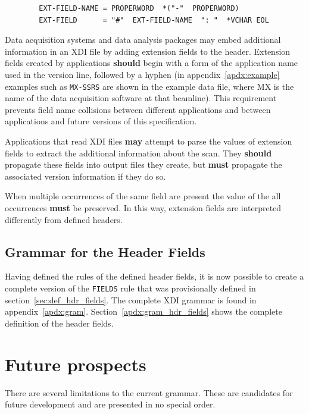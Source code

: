 \documentclass{article}
\newcommand{\xdi}{\textsf{XDI}}
\begin{document}
\begin{verbatim}
        EXT-FIELD-NAME = PROPERWORD  *("-"  PROPERWORD)
        EXT-FIELD      = "#"  EXT-FIELD-NAME  ": "  *VCHAR EOL
\end{verbatim}

Data acquisition systems and data analysis packages may embed
additional information in an {\xdi} file by adding extension fields to
the header.  Extension fields created by applications \textbf{should}
begin with a form of the application name used in the version line,
followed by a hyphen (in appendix~\ref{apdx:example} examples such as
\texttt{MX-SSRS} are shown in the example data file, where MX is the
name of the data acquisition software at that beamline).  This
requirement prevents field name collisions between different
applications and between applications and future versions of this
specification.

Applications that read {\xdi} files \textbf{may} attempt to parse the
values of extension fields to extract the additional information about
the scan.  They \textbf{should} propagate these fields into output
files they create, but \textbf{must} propagate the associated version
information if they do so.

When multiple occurrences of the same field are present the value of
the all occurrences \textbf{must} be preserved.  In this way,
extension fields are interpreted differently from defined headers.

\subsection{Grammar for the Header Fields}
\label{sec:ixsif_fields_grammar}

Having defined the rules of the defined header fields, it is now
possible to create a complete version of the \texttt{FIELDS} rule that
was provisionally defined in section~\ref{sec:def_hdr_fields}.  The
complete {\xdi} grammar is found in appendix~\ref{apdx:gram}.
Section~\ref{apdx:gram_hdr_fields} shows the complete definition of
the header fields.

\section{Future prospects}
\label{sec:future}

There are several limitations to the current grammar.  These are
candidates for future development and are presented in no special
order.
\end{document}
